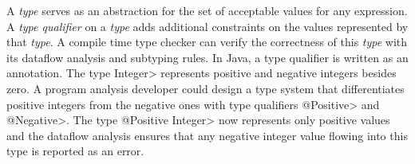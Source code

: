 % 
% 
% 
% 




A \textit{type} serves as an abstraction for the set of acceptable values for any expression.
A \textit{type qualifier} on a \textit{type} adds additional constraints on the values represented by that \textit{type}.
A compile time type checker can verify the correctness of this \textit{type} with its dataflow analysis and subtyping rules.
In Java, a type qualifier is written as an annotation. The type \<Integer> represents positive and negative integers besides zero.
A program analysis developer could design a type system that differentiates positive integers from the negative ones with type qualifiers
\<@Positive> and \<@Negative>.  The type \<@Positive Integer> now represents only positive values and the dataflow analysis ensures that
any negative integer value flowing into this type is reported as an error.

